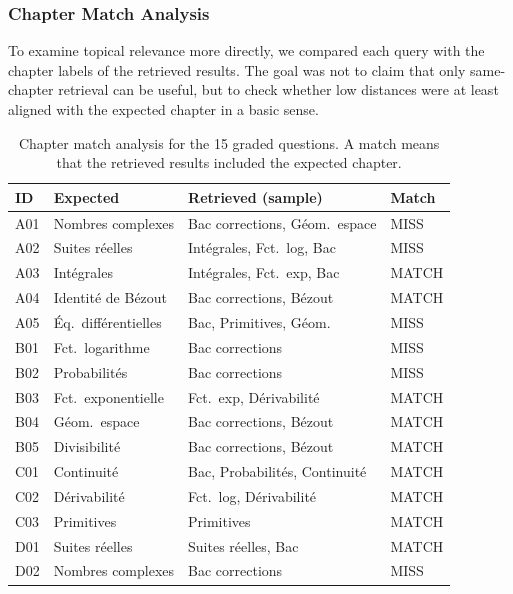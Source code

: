 \subsubsection{Chapter Match Analysis}
\label{subsubsec:chapter-match}

To examine topical relevance more directly, we compared each query with the
chapter labels of the retrieved results. The goal was not to claim that only
same-chapter retrieval can be useful, but to check whether low distances
were at least aligned with the expected chapter in a basic sense.

\begin{table}[H]
\centering
\caption{Chapter match analysis for the 15 graded questions. A match means that the retrieved results included the expected chapter.}
\label{tab:chapter-match}
\begin{tabular}{llll}
\toprule
\textbf{ID} & \textbf{Expected} & \textbf{Retrieved (sample)} & \textbf{Match} \\
\midrule
A01 & Nombres complexes         & Bac corrections, Géom.\ espace      & MISS \\
A02 & Suites réelles            & Intégrales, Fct.\ log, Bac          & MISS \\
A03 & Intégrales                & Intégrales, Fct.\ exp, Bac          & MATCH \\
A04 & Identité de Bézout        & Bac corrections, Bézout             & MATCH \\
A05 & Éq.\ différentielles      & Bac, Primitives, Géom.              & MISS \\
\midrule
B01 & Fct.\ logarithme          & Bac corrections                     & MISS \\
B02 & Probabilités              & Bac corrections                     & MISS \\
B03 & Fct.\ exponentielle       & Fct.\ exp, Dérivabilité             & MATCH \\
B04 & Géom.\ espace             & Bac corrections, Bézout             & MATCH \\
B05 & Divisibilité              & Bac corrections, Bézout             & MATCH \\
\midrule
C01 & Continuité                & Bac, Probabilités, Continuité       & MATCH \\
C02 & Dérivabilité              & Fct.\ log, Dérivabilité             & MATCH \\
C03 & Primitives                & Primitives                          & MATCH \\
\midrule
D01 & Suites réelles            & Suites réelles, Bac                 & MATCH \\
D02 & Nombres complexes         & Bac corrections                     & MISS \\
\bottomrule
\end{tabular}
\end{table}

